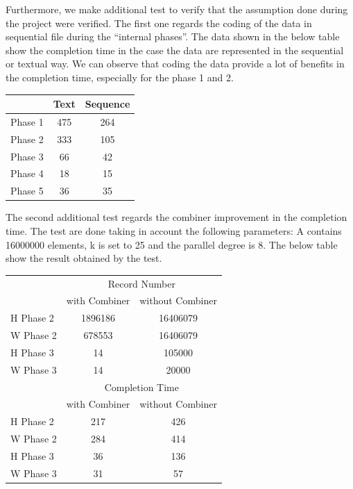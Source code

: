 Furthermore, we make additional test to verify that the assumption done during the project were verified. The first one regards the coding of the data in sequential file during the ``internal phases''. The data shown in the below table show the completion time in the case the data are represented in the sequential or textual way. We can observe that coding the data provide a lot of benefits in the completion time, especially for the phase 1 and 2.

\begin{center}
\begin{tabular}{ | l || c | c | }
  \hline      
  & Text & Sequence \\
  \hline      
  Phase 1 & 475 & 264 \\
  Phase 2 & 333 & 105 \\
  Phase 3 & 66 & 42 \\ 
  Phase 4 & 18 & 15 \\
  Phase 5 & 36 & 35 \\
  \hline  
\end{tabular}
\end{center}

The second additional test regards the combiner improvement in the completion time. The test are done taking in account the following parameters: A contains 16000000 elements, k is set to 25 and the parallel degree is 8. The below table show the result obtained by the test.

\begin{center}
\label{comb_table}
\begin{tabular}{ | l || c | c | }
  \hline      
  & \multicolumn{2}{|c|}{Record Number} \\
  & with Combiner & without Combiner \\
  \hline      
  H Phase 2 & 1896186 & 16406079 \\
  W Phase 2 & 678553 & 16406079 \\ 
  H Phase 3 & 14 & 105000 \\ 
  W Phase 3 & 14 & 20000 \\ 
 \hline  
  \hline      
  & \multicolumn{2}{|c|}{Completion Time} \\
  & with Combiner & without Combiner \\
  \hline      
  H Phase 2 & 217 & 426 \\
  W Phase 2 & 284 & 414 \\ 
  H Phase 3 & 36 & 136 \\ 
  W Phase 3 & 31 & 57 \\ 
 \hline  
\end{tabular}

\end{center}














